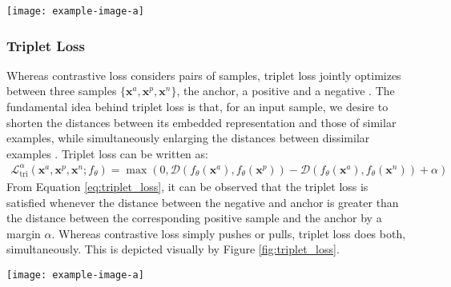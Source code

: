 	\begin{center}
		\begin{figure*}[h]
			\centering
			\texttt{[image: example-image-a]}
			\caption[Pairwise Loss]{Contrastive Loss}
			\label{fig:contrastive_loss}
		\end{figure*}
	\end{center}
	
	
	\subsubsection{Triplet Loss}
	Whereas contrastive loss considers pairs of samples, triplet loss jointly optimizes between three samples $\{\bm{x}^{a}, \bm{x}^{p}, \bm{x}^{n}\}$, the anchor, a positive and a negative \citep{Hermans2017DefenseTripletLoss,Schroff2015FaceNet, Deng2019ArcFaceAngularMarginLoss}. The fundamental idea behind triplet loss is that, for an input sample, we desire to shorten the distances between its embedded representation and those of similar examples, while simultaneously enlarging the distances between dissimilar examples \citep{Sohn2016NPairLoss}. Triplet loss can be written as:
	\begin{align}
	\mathcal{L}^{\alpha}_{\text{tri}}(\bm{x}^{a},\bm{x}^{p},\bm{x}^{n};f_{\theta}) = \max(0,\mathcal{D}(f_{\theta}(\bm{x}^{a}),f_{\theta}(\bm{x}^{p})) - \mathcal{D}(f_{\theta}(\bm{x}^{a}),f_{\theta}(\bm{x}^{n})) + \alpha )
	\label{eq:triplet_loss}
	\end{align}
	\noindent
	From Equation \ref{eq:triplet_loss}, it can be observed that the triplet loss is satisfied whenever the distance between the negative and anchor is greater than the distance between the corresponding positive sample and the anchor by a margin $\alpha$.  Whereas contrastive loss simply pushes or pulls, triplet loss does both, simultaneously.  This is depicted visually by Figure \ref{fig:triplet_loss}.
	
	\begin{center}
		\begin{figure*}[h]
			\centering
			\texttt{[image: example-image-a]}
			\caption[Triplet Loss]{Triplet Loss}
			\label{fig:triplet_loss}
		\end{figure*}
	\end{center}

